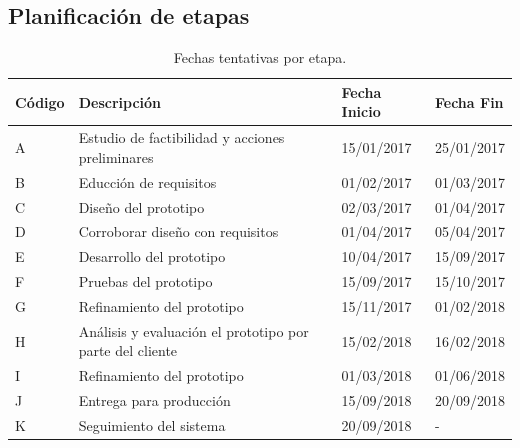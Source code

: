     \subsection{Planificación de etapas} 
      \begin{table}[H]
        \centering
        \begin{tabular}{|l|l|l|l|}
          \hline
          \centering
          Código  & Descripción  & Fecha Inicio & Fecha Fin \\ \hline
          A       & Estudio de factibilidad y acciones preliminares & 15/01/2017 & 25/01/2017 \\ \hline
          B       & Educción de requisitos & 01/02/2017 & 01/03/2017 \\ \hline
          C       & Diseño del prototipo & 02/03/2017 & 01/04/2017 \\ \hline
          D       & Corroborar diseño con requisitos & 01/04/2017 & 05/04/2017 \\ \hline
          E       & Desarrollo del prototipo & 10/04/2017 & 15/09/2017\\ \hline
          F       & Pruebas del prototipo & 15/09/2017 & 15/10/2017 \\ \hline
          G       & Refinamiento del prototipo & 15/11/2017 & 01/02/2018 \\ \hline
          H       & Análisis y evaluación el prototipo por parte del cliente & 15/02/2018 & 16/02/2018 \\ \hline
          I       & Refinamiento del prototipo & 01/03/2018 & 01/06/2018 \\ \hline
          J       & Entrega para producción & 15/09/2018 & 20/09/2018 \\ \hline
          K       & Seguimiento del sistema & 20/09/2018 & - \\ \hline
        \end{tabular}
        \caption {Fechas tentativas por etapa.}
      \end{table}

